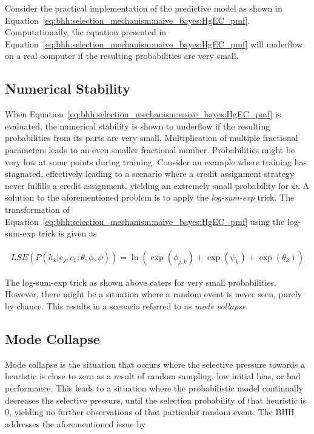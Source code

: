 Consider the practical implementation of the predictive model as shown in Equation~\eqref{eq:bhh:selection_mechanism:naive_bayes:HgEC_pmf}. Computationally, the equation presented in Equation~\eqref{eq:bhh:selection_mechanism:naive_bayes:HgEC_pmf} will underflow on a real computer if the resulting probabilities are very small.

\subsection{Numerical Stability}\label{sec:bhh:selection_mechanism:numerical_stability}

When Equation~\eqref{eq:bhh:selection_mechanism:naive_bayes:HgEC_pmf} is evaluated, the numerical stability is shown to underflow if the resulting probabilities from its parts are very small. Multiplication of multiple fractional parameters leads to an even smaller fractional number. Probabilities might be very low at some points during training. Consider an example where training has stagnated, effectively leading to a scenario where a credit assignment strategy never fulfills a credit assignment, yielding an extremely small probability for $\boldsymbol{\psi}$. A solution to the aforementioned problem is to apply the \textit{log-sum-exp} trick. The transformation of Equation~\eqref{eq:bhh:selection_mechanism:naive_bayes:HgEC_pmf} using the log-sum-exp trick is given as

\begin{equation}
      \label{eq:bhh:selection_mechanism:numerical_stability:log_sum_exp}
      \begin{split}
            LSE(P(h_{k} \vert e_{j}, c_{1};  \theta, \phi, \psi)) = \ln(\exp(\phi_{j,k}) +  \exp(\psi_{k}) + \exp(\theta_{k}))
      \end{split}
\end{equation}

The log-sum-exp trick as shown above caters for very small probabilities. However, there might be a situation where a random event is never seen, purely by chance. This results in a scenario referred to as \textit{mode collapse}.

\subsection{Mode Collapse}\label{sec:bhh:selection_mechanism:mode_collapse}

Mode collapse is the situation that occurs where the selective pressure towards a heuristic is close to zero as a result of random sampling, low initial bias, or bad performance. This leads to a situation where the probabilistic model continually decreases the selective pressure, until the selection probability of that heuristic is 0, yielding no further observations of that particular random event. The \acs{BHH} addresses the aforementioned issue by

